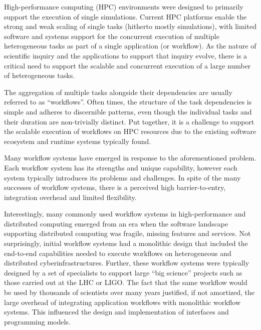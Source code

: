 
High-performance computing (HPC) environments were designed to primarily support
the execution of single simulations. Current HPC platforms enable
the strong and weak scaling of single tasks (hitherto mostly simulations),
with limited software and systems support for the concurrent execution of
multiple heterogeneous tasks as part of a single application (or workflow). As
the nature of scientific inquiry and the applications to support that inquiry
evolve, there is a critical need to support the scalable and concurrent
execution of a large number of heterogeneous tasks.


The aggregation of multiple tasks alongside their dependencies are usually
referred to as ``workflows''. Often times, the structure of the task
dependencies is simple and adheres to discernible patterns, even though the
individual tasks and their duration are non-trivially distinct. Put together,
it is a challenge to support the scalable execution of workflows on HPC
resources due to the existing software ecosystem and runtime systems
typically found.

Many workflow systems have emerged in response to the
aforementioned problem. Each workflow system has its strengths and unique
capability, however each system typically introduces its problems
and challenges. In spite of the many successes of workflow systems, there is
a perceived high barrier-to-entry, integration overhead and limited
flexibility.

Interestingly, many commonly used workflow systems in high-performance and
distributed computing emerged from an era when the software landscape
supporting distributed computing was fragile, missing features and services.
Not surprisingly, initial workflow systems had a monolithic design that
included the end-to-end capabilities needed to execute workflows on
heterogeneous and distributed cyberinfrastructures. Further, these workflow
systems were typically designed by a set of specialists to support large
``big science'' projects such as those carried out at the LHC or LIGO\@. The
fact that the same workflow would be used by thousands of scientists over
many years justified, if not amortized, the large overhead of integrating
application workflows with monolithic workflow systems. This influenced the
design and implementation of %
interfaces and programming models.

